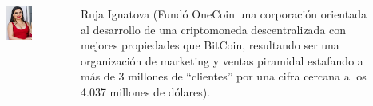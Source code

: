 \documentclass[aspectratio=169]{beamer}
\begin{document}
\begin{frame}
\begin{columns}
\begin{column}{0.5\textwidth}
\begin{figure}
\includegraphics[width=.6\textwidth]{Ruja.png}
\end{figure}   
\end{column}
\begin{column}{0.5\textwidth}
Ruja Ignatova (Fundó OneCoin una corporación orientada al desarrollo de una criptomoneda descentralizada con mejores propiedades que BitCoin, resultando ser una organización de marketing y ventas piramidal estafando a más de 3 millones de ``clientes'' por una cifra cercana a los 4.037 millones de dólares).
\end{column}
\end{columns}
\end{frame}
\end{document}

